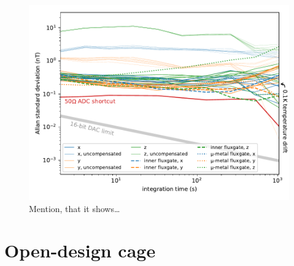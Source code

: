 \begin{figure}
  \centering
  \includegraphics[width=0.9\linewidth]{gfx/prototype/run7_field_stability.pdf}
  \caption{Mention, that it shows\ldots}
  \label{fig:prototype_stability}
\end{figure}



\section{Open-design cage}

